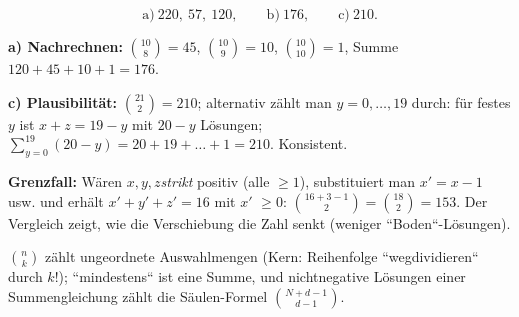 \begin{ergebnis}
\begin{equation*}
  \text{a)}\ 220,\ 57,\ 120,\qquad
  \text{b)}\ 176,\qquad
  \text{c)}\ 210 .
\end{equation*}
\end{ergebnis}

\begin{kontrolle}
\textbf{a) Nachrechnen:} $\binom{10}{8}=45$, $\binom{10}{9}=10$,
$\binom{10}{10}=1$, Summe $120+45+10+1=176$. \checkmark

\textbf{c) Plausibilität:} $\binom{21}{2}=210$; alternativ zählt man
$y=0,\dots,19$ durch: für festes $y$ ist $x+z=19-y$ mit $20-y$ Lösungen;
$\sum_{y=0}^{19}(20-y)=20+19+\dots+1=210$. Konsistent.

\textbf{Grenzfall:} W\"aren $x,y,z$\emph{strikt} positiv (alle $\ge1$),
substituiert man $x'=x-1$ usw. und erhält $x'+y'+z'=16$ mit $x'$
$\ge0$: $\binom{16+3-1}{2}=\binom{18}{2}=153$. Der Vergleich zeigt, wie
die Verschiebung die Zahl senkt (weniger ``Boden``-Lösungen).
\end{kontrolle}

\begin{merksatz}
$\binom{n}{k}$ z\"ahlt ungeordnete Auswahlmengen (Kern: Reihenfolge
``wegdividieren`` durch $k!$); ``mindestens`` ist eine Summe, und
nichtnegative Lösungen einer Summengleichung z\"ahlt die
S\"aulen-Formel $\binom{N+d-1}{d-1}$.
\end{merksatz}
